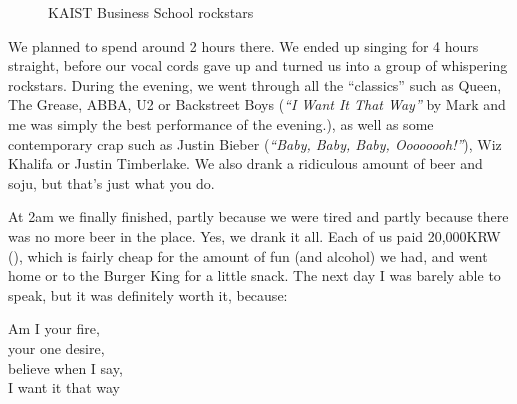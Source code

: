 \begin{post}
\begin{content}
\begin{figure}[h]
\centering
{}
\caption{KAIST Business School rockstars}
\end{figure}

We planned to spend around 2 hours there. We ended up singing for 4 hours straight, before our vocal cords gave up and turned us into a group of whispering rockstars. During the evening, we went through all the ``classics'' such as Queen, The Grease, ABBA, U2 or Backstreet Boys (\textit{``I Want It That Way''} by Mark and me was simply the best performance of the evening.), as well as some contemporary crap such as Justin Bieber (\textit{``Baby, Baby, Baby, Oooooooh!''}), Wiz Khalifa or Justin Timberlake. We also drank a ridiculous amount of beer and soju, but that's just what you do.

At 2am we finally finished, partly because we were tired and partly because there was no more beer in the place. Yes, we drank it all. Each of us paid 20,000KRW (), which is fairly cheap for the amount of fun (and alcohol) we had, and went home or to the Burger King for a little snack. The next day I was barely able to speak, but it was definitely worth it, because:

\begin{blockquote}Am I your fire,\\
your one desire,\\
believe when I say,\\
I want it that way\end{blockquote}

	\end{content}
\end{post}
